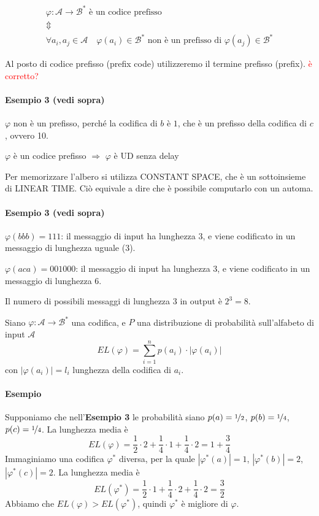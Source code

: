 \begin{definition}
    \begin{eqnarray*}
        &\varphi : \mathcal{A} \to \mathcal{B}^* \text{ è un codice prefisso}&\\
        &\Updownarrow&\\
        &\forall a_i,a_j\in\mathcal{A} \quad \varphi(a_i)\in\mathcal{B}^*\text{ non è un prefisso di }\varphi(a_j)\in\mathcal{B}^*&
    \end{eqnarray*}
\end{definition}
Al posto di codice prefisso (prefix code) utilizzeremo il termine prefisso (prefix). \textcolor{Red}{è corretto?}

\paragraph{Esempio 3 (vedi sopra)} $\varphi$ non è un prefisso, perché la codifica di $b$ è $1$, che è un prefisso della codifica di $c$, ovvero 10.

\begin{lemma}
    $\varphi$ è un codice prefisso \quad $\Rightarrow$ \quad $\varphi$ è UD senza delay
\end{lemma}
Per memorizzare l'albero si utilizza CONSTANT SPACE, che è un sottoinsieme di LINEAR TIME. Ciò equivale a dire che è possibile computarlo con un automa.

\paragraph{Esempio 3 (vedi sopra)} $\varphi(bbb)=111$: il messaggio di input ha lunghezza 3, e viene codificato in un messaggio di lunghezza uguale (3). 

$\varphi(aca)=001000$: il messaggio di input ha lunghezza 3, e viene codificato in un messaggio di lunghezza 6.

Il numero di possibili messaggi di lunghezza 3 in output è $2^3=8$.

\begin{definition}
    Siano $\varphi:\mathcal{A}\to\mathcal{B}^*$ una codifica, e $P$ una distribuzione di probabilità sull'alfabeto di input $\mathcal{A}$
    $$
        EL(\varphi) = \sum_{i=1}^n p(a_i)\cdot|\varphi(a_i)|
    $$
    con $|\varphi(a_i)|=l_i$ lunghezza della codifica di $a_i$.
\end{definition}

\paragraph{Esempio} Supponiamo che nell'\textbf{Esempio 3} le probabilità siano $p(a)=\nicefrac{1}{2}$, $p(b)=\nicefrac{1}{4}$, $p(c)=\nicefrac{1}{4}$. La lunghezza media è
$$
    EL(\varphi) = \frac{1}{2}\cdot 2 + \frac{1}{4}\cdot 1 + \frac{1}{4}\cdot 2 = 1+\frac{3}{4}
$$
Immaginiamo una codifica $\varphi^*$ diversa, per la quale $|\varphi^*(a)|=1$, $|\varphi^*(b)|=2$, $|\varphi^*(c)|=2$. La lunghezza media è
$$
    EL(\varphi^*) = \frac{1}{2}\cdot 1 + \frac{1}{4}\cdot 2 + \frac{1}{4}\cdot 2 = \frac{3}{2}
$$
Abbiamo che $EL(\varphi)>EL(\varphi^*)$, quindi $\varphi^*$ è migliore di $\varphi$.\bigskip

